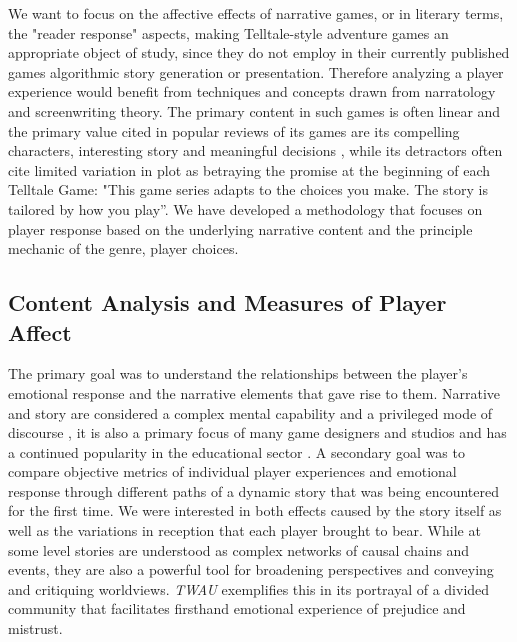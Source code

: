 We want to focus on the affective effects of narrative games, or in
literary terms, the "reader response" aspects, making Telltale-style
adventure games an appropriate object of study, since they do not
employ in their currently published games algorithmic story generation
or presentation. Therefore analyzing a player experience would benefit
from techniques and concepts drawn from narratology and screenwriting
theory. The primary content in such games is often linear and the
primary value cited in popular reviews of its games are its compelling
characters, interesting story and meaningful decisions
\cite{Macgregor2015-do}, while its detractors often cite limited
variation in plot as betraying the promise at the beginning of each
Telltale Game: "This game series adapts to the choices you make. The
story is tailored by how you play”. We have developed a methodology
that focuses on player response based on the underlying narrative
content and the principle mechanic of the genre, player choices.

\subsection{Content Analysis and Measures of Player Affect}
\label{sec:org6be524e}

The primary goal was to understand the relationships between the
player's emotional response and the narrative elements that gave rise
to them. Narrative and story are considered a complex mental
capability \cite{Herman2013-ab} and a privileged mode of discourse ,
it is also a primary focus of many game designers and studios
\cite{Salter2017-mp} and has a continued popularity in the educational
sector \cite{Rowe2009-pv}. A secondary goal was to compare objective
metrics of individual player experiences and emotional response
through different paths of a dynamic story that was being encountered
for the first time. We were interested in both effects caused by the
story itself as well as the variations in reception that each player
brought to bear. While at some level stories are understood as complex
networks of causal chains and events, they are also a powerful tool
for broadening perspectives and conveying and critiquing
worldviews. \emph{TWAU} exemplifies this in its portrayal of a divided
community that facilitates firsthand emotional experience of prejudice
and mistrust.

